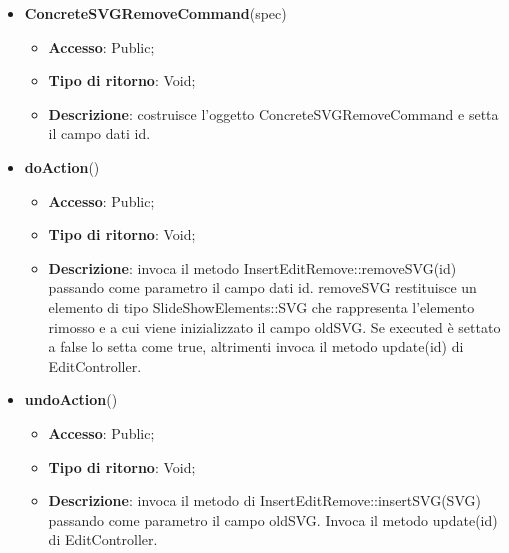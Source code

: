 {{{	
	\begin{itemize}
		\item \textbf{ConcreteSVGRemoveCommand}(spec)
		\begin{itemize}
			\item \textbf{Accesso}: Public;
			\item \textbf{Tipo di ritorno}: Void;
			\item \textbf{Descrizione}: costruisce l’oggetto ConcreteSVGRemoveCommand e setta il campo dati id.
		\end{itemize}
		\item \textbf{doAction}()
		\begin{itemize}
			\item \textbf{Accesso}: Public;
			\item \textbf{Tipo di ritorno}: Void;
			\item \textbf{Descrizione}: invoca il metodo InsertEditRemove::removeSVG(id) passando come parametro il campo dati id.	removeSVG restituisce un elemento di tipo SlideShowElements::SVG che rappresenta l’elemento rimosso e a cui viene inizializzato il campo oldSVG. Se executed è settato a false lo setta come true, altrimenti invoca il metodo update(id) di EditController.
		\end{itemize}
		\item \textbf{undoAction}()
		\begin{itemize}
			\item \textbf{Accesso}: Public;
			\item \textbf{Tipo di ritorno}: Void;
			\item \textbf{Descrizione}: invoca il metodo di InsertEditRemove::insertSVG(SVG) passando come parametro il campo oldSVG. Invoca il metodo update(id) di EditController.
		\end{itemize}
	\end{itemize}
	}
}}
